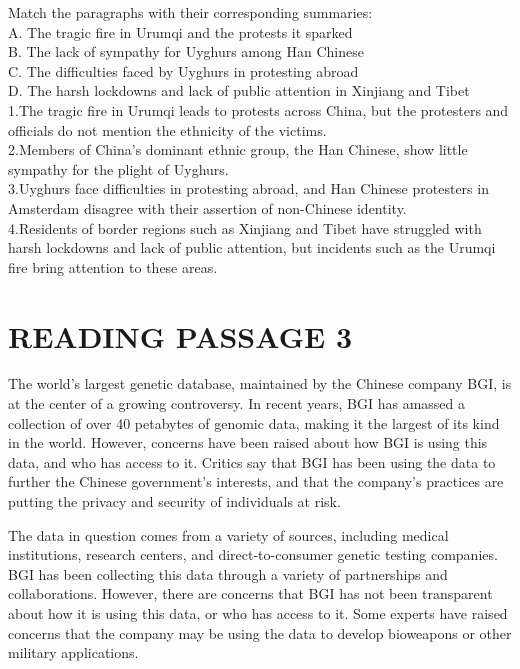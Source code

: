 \documentclass[10pt, a4paper, oneside]{article}
\begin{document}
\begin{spacing}{2.0}
Match the paragraphs with their corresponding summaries:\\

A. The tragic fire in Urumqi and the protests it sparked\\
B. The lack of sympathy for Uyghurs among Han Chinese\\
C. The difficulties faced by Uyghurs in protesting abroad\\
D. The harsh lockdowns and lack of public attention in Xinjiang and Tibet\\

1.The tragic fire in Urumqi leads to protests across China, but the protesters and officials do not mention the ethnicity of the victims.\\
2.Members of China's dominant ethnic group, the Han Chinese, show little sympathy for the plight of Uyghurs.\\
3.Uyghurs face difficulties in protesting abroad, and Han Chinese protesters in Amsterdam disagree with their assertion of non-Chinese identity.\\
4.Residents of border regions such as Xinjiang and Tibet have struggled with harsh lockdowns and lack of public attention, but incidents such as the Urumqi fire bring attention to these areas.\\


\section{READING PASSAGE 3}
The world's largest genetic database, maintained by the Chinese company BGI, is at the center of a growing controversy. 
In recent years, BGI has amassed a collection of over 40 petabytes of genomic data, making it the largest of its kind in the world. 
However, concerns have been raised about how BGI is using this data, and who has access to it. 
Critics say that BGI has been using the data to further the Chinese government's interests, and that the company's 
practices are putting the privacy and security of individuals at risk.

The data in question comes from a variety of sources, including medical institutions, research centers, 
and direct-to-consumer genetic testing companies. BGI has been collecting this data through a variety of partnerships 
and collaborations. However, there are concerns that BGI has not been transparent about how it is using this data, 
or who has access to it. Some experts have raised concerns that the company may be using the data to develop bioweapons 
or other military applications.


\end{spacing}
\end{document}
